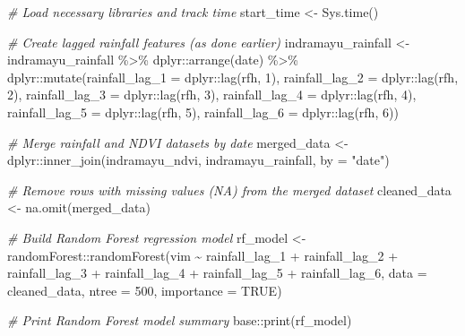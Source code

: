 \documentclass[
]{article}
\newenvironment{Shaded}{}{}
\newcommand{\AttributeTok}[1]{\textcolor[rgb]{0.49,0.56,0.16}{#1}}
\newcommand{\CommentTok}[1]{\textcolor[rgb]{0.38,0.63,0.69}{\textit{#1}}}
\newcommand{\ConstantTok}[1]{\textcolor[rgb]{0.53,0.00,0.00}{#1}}
\newcommand{\DecValTok}[1]{\textcolor[rgb]{0.25,0.63,0.44}{#1}}
\newcommand{\FunctionTok}[1]{\textcolor[rgb]{0.02,0.16,0.49}{#1}}
\newcommand{\NormalTok}[1]{#1}
\newcommand{\OtherTok}[1]{\textcolor[rgb]{0.00,0.44,0.13}{#1}}
\newcommand{\SpecialCharTok}[1]{\textcolor[rgb]{0.25,0.44,0.63}{#1}}
\newcommand{\StringTok}[1]{\textcolor[rgb]{0.25,0.44,0.63}{#1}}
\begin{document}
\begin{Shaded}
\begin{Highlighting}[]
\CommentTok{\# Load necessary libraries and track time}
\NormalTok{start\_time }\OtherTok{\textless{}{-}} \FunctionTok{Sys.time}\NormalTok{()}

\CommentTok{\# Create lagged rainfall features (as done earlier)}
\NormalTok{indramayu\_rainfall }\OtherTok{\textless{}{-}}\NormalTok{ indramayu\_rainfall }\SpecialCharTok{\%\textgreater{}\%}
\NormalTok{  dplyr}\SpecialCharTok{::}\FunctionTok{arrange}\NormalTok{(date) }\SpecialCharTok{\%\textgreater{}\%}
\NormalTok{  dplyr}\SpecialCharTok{::}\FunctionTok{mutate}\NormalTok{(}\AttributeTok{rainfall\_lag\_1 =}\NormalTok{ dplyr}\SpecialCharTok{::}\FunctionTok{lag}\NormalTok{(rfh, }\DecValTok{1}\NormalTok{),}
                \AttributeTok{rainfall\_lag\_2 =}\NormalTok{ dplyr}\SpecialCharTok{::}\FunctionTok{lag}\NormalTok{(rfh, }\DecValTok{2}\NormalTok{),}
                \AttributeTok{rainfall\_lag\_3 =}\NormalTok{ dplyr}\SpecialCharTok{::}\FunctionTok{lag}\NormalTok{(rfh, }\DecValTok{3}\NormalTok{),}
                \AttributeTok{rainfall\_lag\_4 =}\NormalTok{ dplyr}\SpecialCharTok{::}\FunctionTok{lag}\NormalTok{(rfh, }\DecValTok{4}\NormalTok{),}
                \AttributeTok{rainfall\_lag\_5 =}\NormalTok{ dplyr}\SpecialCharTok{::}\FunctionTok{lag}\NormalTok{(rfh, }\DecValTok{5}\NormalTok{),}
                \AttributeTok{rainfall\_lag\_6 =}\NormalTok{ dplyr}\SpecialCharTok{::}\FunctionTok{lag}\NormalTok{(rfh, }\DecValTok{6}\NormalTok{))}

\CommentTok{\# Merge rainfall and NDVI datasets by date}
\NormalTok{merged\_data }\OtherTok{\textless{}{-}}\NormalTok{ dplyr}\SpecialCharTok{::}\FunctionTok{inner\_join}\NormalTok{(indramayu\_ndvi, }
\NormalTok{                                 indramayu\_rainfall, }
                                 \AttributeTok{by =} \StringTok{"date"}\NormalTok{)}

\CommentTok{\# Remove rows with missing values (NA) from the merged dataset}
\NormalTok{cleaned\_data }\OtherTok{\textless{}{-}} \FunctionTok{na.omit}\NormalTok{(merged\_data)}

\CommentTok{\# Build Random Forest regression model}
\NormalTok{rf\_model }\OtherTok{\textless{}{-}}\NormalTok{ randomForest}\SpecialCharTok{::}\FunctionTok{randomForest}\NormalTok{(vim }\SpecialCharTok{\textasciitilde{}}\NormalTok{ rainfall\_lag\_1 }\SpecialCharTok{+}\NormalTok{ rainfall\_lag\_2 }\SpecialCharTok{+} 
\NormalTok{                                       rainfall\_lag\_3 }\SpecialCharTok{+}\NormalTok{ rainfall\_lag\_4 }\SpecialCharTok{+} 
\NormalTok{                                       rainfall\_lag\_5 }\SpecialCharTok{+}\NormalTok{ rainfall\_lag\_6, }
                                       \AttributeTok{data =}\NormalTok{ cleaned\_data, }
                                       \AttributeTok{ntree =} \DecValTok{500}\NormalTok{, }
                                       \AttributeTok{importance =} \ConstantTok{TRUE}\NormalTok{)}

\CommentTok{\# Print Random Forest model summary}
\NormalTok{base}\SpecialCharTok{::}\FunctionTok{print}\NormalTok{(rf\_model)}
\end{Highlighting}
\end{Shaded}
\end{document}

